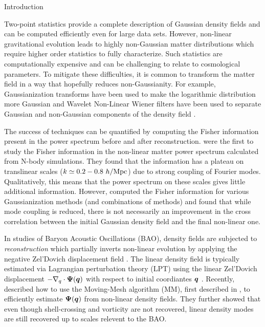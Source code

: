 \begin{section}{Introduction}\label{sec:introduction}  

  Two-point statistics provide a complete description of Gaussian
  density fields and can be computed efficiently even for large data
  sets.  However, non-linear gravitational evolution leads to highly
  non-Gaussian matter distributions which require higher order
  statistics to fully characterize.  Such statistics are
  computationally expensive and can be challenging to relate to
  cosmological parameters.  To mitigate these difficulties, it is
  common to transform the matter field in a way that hopefully reduces
  non-Gaussianity.  For example, Gaussianization transforms have been
  used to make the logarithmic distribution more Gaussian
  \cite{bib:Weinberg1992,bib:Mark2009} and Wavelet Non-Linear Wiener
  filters have been used to separate Gaussian and non-Gaussian
  components of the density field
  \cite{bib:Zhang2011,bib:Yu2012,bib:HarnoisD2013}.

  The success of techniques can be quantified by computing the Fisher
  information present in the power spectrum before and after
  reconstruction.  \citet{bib:Rimes2006}
  were the first to study the Fisher information in the non-linear
  matter power spectrum calculated from N-body simulations.  They
  found that the information has a plateau on translinear scales
  ($k \simeq 0.2-0.8\ h/{\rm Mpc}$) due to strong coupling of Fourier
  modes.  Qualitatively, this means that the power spectrum on these
  scales gives little additional information.  
  However, \citet{bib:HarnoisD2013} computed the Fisher information
  for various Gaussianization methods (and combinations of methods)
  and found that while mode coupling is reduced, there is not
  necessarily an improvement in the cross correlation between the
  initial Gaussian density field and the final non-linear one. 

  In studies of Baryon Acoustic Oscillations (BAO), density fields are
  subjected to {\it reconstruction} which partially inverts non-linear
  evolution by applying the negative Zel'Dovich displacement field \cite{bib:Eisenstein2007}.
  The linear density field is
  typically estimated via Lagrangian perturbation theory (LPT)
  using the linear Zel'Dovich displacement $-\nabla_q\cdot\boldsymbol\Psi(\boldsymbol q)$
  with respect to initial coordiantes $\boldsymbol{q}$ \cite{bib:Zel1970}.
  Recently, \citet{bib:Zhu2016} described how to use the Moving-Mesh
  algorithm (MM), first described in \cite{bib:Pen1995,bib:Pen1998},
  to efficiently estimate $\boldsymbol{\Psi}(\boldsymbol{q})$ from non-linear
  density fields.  They further showed that even though shell-crossing
  and vorticity are not recovered, linear density modes are still 
  recovered up to scales relevent to the BAO.


\end{section}
